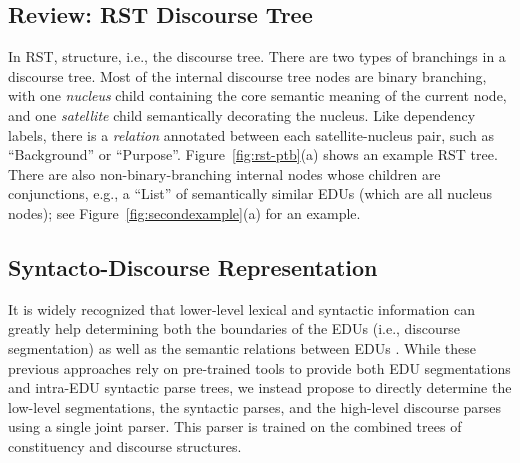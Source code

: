 \documentclass[11pt,letterpaper]{article}
\begin{document}
 


\subsection{Review: RST Discourse Tree}

In RST, 
structure, i.e., the discourse tree.
There are two types of branchings in a discourse tree. 
Most of the internal discourse tree
nodes are binary branching, with one {\it nucleus} child 
containing the core semantic meaning of the current node, 
and one {\it satellite} child semantically decorating 
the nucleus. Like dependency labels,
there is a {\em relation} annotated 
between each satellite-nucleus pair, 
such as ``Background'' or ``Purpose''.
Figure~\ref{fig:rst-ptb}(a) shows an example RST tree.
There are also non-binary-branching internal nodes whose children are conjunctions, e.g., a ``List'' of semantically similar
EDUs (which are all nucleus nodes); see Figure~\ref{fig:secondexample}(a) for an example.

\subsection{Syntacto-Discourse Representation}

It is widely recognized that lower-level lexical and syntactic information can greatly help 
determining both the boundaries of the EDUs 
(i.e., discourse segmentation) \cite{bach2012reranking} 
as well as the semantic relations between EDUs 
\cite{soricut2003sentence,hernault2010hilda,joty2014discriminative,feng2014linear,ji2014representation,li2014recursive,heilman2015fast}.
While these previous approaches 
rely
on pre-trained tools to provide 
both EDU segmentations and
intra-EDU syntactic parse trees,
we instead propose to directly determine 
the low-level segmentations,
the syntactic parses,
and the high-level discourse parses
using a single joint parser.
This parser is trained on the combined trees of constituency 
and discourse structures.
\end{document}
